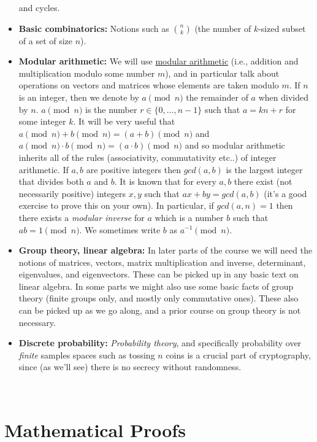 \begin{itemize}
  and cycles.
\item
  \textbf{Basic combinatorics:} Notions such as \(\binom{n}{k}\) (the
  number of \(k\)-sized subset of a set of size \(n\)).
\item
  \textbf{Modular arithmetic:} We will use
  \href{https://en.wikipedia.org/wiki/Modular_arithmetic}{modular
  arithmetic} (i.e., addition and multiplication modulo some number
  \(m\)), and in particular talk about operations on vectors and
  matrices whose elements are taken modulo \(m\). If \(n\) is an
  integer, then we denote by \(a \pmod{n}\) the remainder of \(a\) when
  divided by \(n\). \(a\pmod{n}\) is the number \(r\in\{0,\ldots,n-1\}\)
  such that \(a = kn+r\) for some integer \(k\). It will be very useful
  that \(a\pmod{n} + b \pmod{n} = (a+b) \pmod{n}\) and
  \(a\pmod{n} \cdot b \pmod{n} = (a\cdot b) \pmod{n}\) and so modular
  arithmetic inherits all of the rules (associativity, commutativity
  etc..) of integer arithmetic. If \(a,b\) are positive integers then
  \(gcd(a,b)\) is the largest integer that divides both \(a\) and \(b\).
  It is known that for every \(a,b\) there exist (not necessarily
  positive) integers \(x,y\) such that \(ax + by = gcd(a,b)\) (it's a
  good exercise to prove this on your own). In particular, if
  \(gcd(a,n)=1\) then there exists a \emph{modular inverse} for \(a\)
  which is a number \(b\) such that \(ab = 1 \pmod{n}\). We sometimes
  write \(b\) as \(a^{-1} \pmod{n}\).
\item
  \textbf{Group theory, linear algebra:} In later parts of the course we
  will need the notions of matrices, vectors, matrix multiplication and
  inverse, determinant, eigenvalues, and eigenvectors. These can be
  picked up in any basic text on linear algebra. In some parts we might
  also use some basic facts of group theory (finite groups only, and
  mostly only commutative ones). These also can be picked up as we go
  along, and a prior course on group theory is not necessary.
\item
  \textbf{Discrete probability:} \emph{Probability theory}, and
  specifically probability over \emph{finite} samples spaces such as
  tossing \(n\) coins is a crucial part of cryptography, since (as we'll
  see) there is no secrecy without randomness.
\end{itemize}

~

\section{Mathematical Proofs}\label{Mathematical-Proofs}

